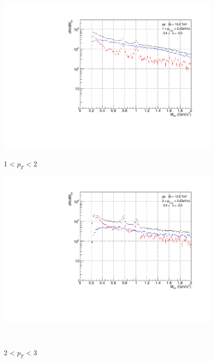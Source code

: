                 \begin{figure}[H]
                    \centering
                    \begin{minipage}{0.45\textwidth}
                        \centering
                        \includegraphics[width=\textwidth]{fig/3_4_1_CB_pt_1to2.pdf}
                        \caption*{1 < $p_{T}$ < 2}
                    \end{minipage}
                    \hfill
                    \begin{minipage}{0.45\textwidth}
                        \centering
                        \includegraphics[width=\textwidth]{fig/3_4_1_CB_pt_2to3.pdf}
                        \caption*{2 < $p_{T}$ < 3}
                    \end{minipage}
                    \\

\end{figure}
